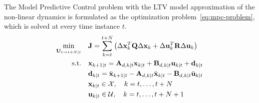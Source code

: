 \documentclass[../main.tex]{subfiles}
\begin{document}
The Model Predictive Control problem with the LTV
model approximation of the non-linear dynamics is formulated as the optimization
problem~\ref{eq:mpc-problem}, which is solved at every time instance $t$.
\begin{equation}\label{eq:mpc-problem}
	\begin{aligned}
		\min_{\mathbf{U}_{t \to t+N | t}} \quad & \mathbf{J} = \sum_{k=t}^{t+N} \left( \Delta
			\mathbf{x}_k^T \mathbf{Q} \Delta \mathbf{x}_k + \Delta \mathbf{u}_k^T \mathbf{R}
			\Delta \mathbf{u}_k \right)\\
		\text{s.t.} \quad & \mathbf{x}_{k+1 | t} = \mathbf{A}_{d,k | t} \mathbf{x}_{k |
		t} + \mathbf{B}_{d,k | t} \mathbf{u}_{k | t} + \mathbf{d}_{k | t}\\
						  & \mathbf{d}_{k | t} = \bar{\mathbf{x}}_{k+1 | t} -
						  \mathbf{A}_{d,k | t} \bar{\mathbf{x}}_{k | t} - \mathbf{B}_{d,k
						  | t} \bar{\mathbf{u}}_{k | t}\\
						  & \mathbf{x}_{k | t} \in \mathcal{X}, \quad k = t, \ldots,
						  t+N\\
						  & \mathbf{u}_{k | t}
						  \in \mathcal{U}, \quad k = t, \ldots, t+N+1\\
		\end{aligned}
\end{equation}
\end{document}
